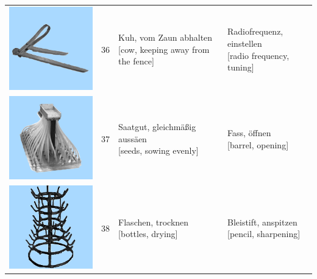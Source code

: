 \documentclass[
  english,
  doc,12pt,twoside,floatsintext]{apa7}
\begin{document}
\begin{center}
\begin{ThreePartTable}
{\begin{longtable}{llll}
\includegraphics[valign=c, scale=0.23]{../materials/unfamiliar/36.png} & 36 & \makecell[l]{Kuh, vom Zaun abhalten\\{[cow, keeping away from the fence]}} & \makecell[l]{Radiofrequenz, einstellen\\{[radio frequency, tuning]}}\\
\includegraphics[valign=c, scale=0.23]{../materials/unfamiliar/37.png} & 37 & \makecell[l]{Saatgut, gleichmäßig aussäen\\{[seeds, sowing evenly]}} & \makecell[l]{Fass, öffnen\\{[barrel, opening]}}\\
\includegraphics[valign=c, scale=0.23]{../materials/unfamiliar/38.png} & 38 & \makecell[l]{Flaschen, trocknen\\{[bottles, drying]}} & \makecell[l]{Bleistift, anspitzen\\{[pencil, sharpening]}}\\

\end{longtable}}
\end{ThreePartTable}
\end{center}
\end{document}
